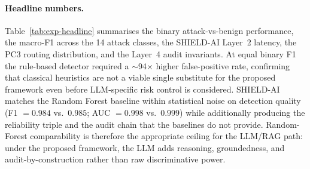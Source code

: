\documentclass[preprint,12pt,authoryear]{elsarticle}
\begin{document}
\paragraph{Headline numbers.}
Table~\ref{tab:exp-headline} summarises the binary attack-vs-benign performance, the macro-F1 across the 14 attack classes, the SHIELD-AI Layer~2 latency, the PC3 routing distribution, and the Layer~4 audit invariants.  At equal binary F1 the rule-based detector required a $\sim$94$\times$ higher false-positive rate, confirming that classical heuristics are not a viable single substitute for the proposed framework even before LLM-specific risk control is considered.  SHIELD-AI matches the Random Forest baseline within statistical noise on detection quality (F1 $=0.984$ vs.\ $0.985$; AUC $=0.998$ vs.\ $0.999$) while additionally producing the reliability triple and the audit chain that the baselines do not provide.  Random-Forest comparability is therefore the appropriate ceiling for the LLM/RAG path: under the proposed framework, the LLM adds reasoning, groundedness, and audit-by-construction rather than raw discriminative power.

\begin{table}[ht]
\centering
\caption{Reference-experiment headline results on $15{,}000$ \emph{synthetic} test flows produced by the CICIDS-2017-like generator (seed 42).  Binary F1 / FPR / AUC are computed over the BENIGN-vs-attack contrast.  Macro-F1 averages per-class F1 across the 14 attack classes.  Latency is per-alert wall-clock on a commodity laptop with no GPU.  Routing share is the Layer-3 PC3 outcome under the cost calibration of §\ref{ssec:empirical}.  Audit shows the Lemma~1 chain verification result and the Algorithm~PC5 record verifier spot-check.  Numbers do not transfer to the real CICIDS-2017 dataset without re-running the harness against the published CSVs (loader provided).}
\label{tab:exp-headline}
\small
{}%
\end{table}
\end{document}
